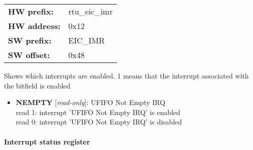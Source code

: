 \begin{tabular}{l l }
{\bf HW prefix:}  & rtu\_eic\_imr\\
{\bf HW address:}  & 0x12\\
{\bf SW prefix:}  & EIC\_IMR\\
{\bf SW offset:}  & 0x48\\
\end{tabular}

\vspace{12pt}
Shows which interrupts are enabled. 1 means that the interrupt associated with the bitfield is enabled

\vspace{12pt}
\noindent
{}

\begin{itemize}
\item \begin{small}
{\bf 
NEMPTY
} [\emph{read-only}]: UFIFO Not Empty IRQ
\\
read 1: interrupt 'UFIFO Not Empty IRQ' is enabled\\read 0: interrupt 'UFIFO Not Empty IRQ' is disabled
\end{small}
\end{itemize}
\paragraph*{Interrupt status register}\vspace{12pt}

